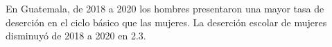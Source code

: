 En Guatemala, de 2018 a 2020 los hombres presentaron una mayor tasa de deserción en el ciclo básico que las mujeres. La deserción escolar de mujeres disminuyó de 2018 a 2020 en 2.3.